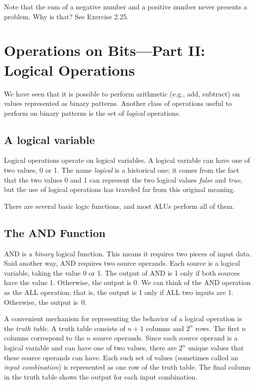 \documentclass{patt}
\begin{document}
\pagebreak

Note that the sum of a negative number and a positive number never
presents a problem.  Why is that? See Exercise 2.25.

\section{Operations on Bits---Part II: Logical Operations}

We have seen that it is possible to perform arithmetic (e.g., add,
subtract) on values represented as binary patterns.  Another class of
operations useful to perform on binary patterns is the set
of {\em logical} operations.

\subsection{A logical variable}

Logical operations operate on logical variables.  A logical variable
can have one of two values, 0 or 1.  The name {\em logical} is a
historical one; it comes from the fact that the two values 0 and 1 can
represent the two logical values {\em false} and {\em true}, but the
use of logical operations has traveled far from this original meaning.

There are several basic logic functions, and most ALUs perform all of them.

\subsection{The AND Function}

AND is a {\em binary} logical function.  This means it requires two
pieces of input data.
Said another way, AND requires two source operands.  Each source
is a logical variable, taking the value 0 or 1.  The output of
AND is 1 only if both sources
have the value 1.  Otherwise, the output is 0.  We can think
of the AND operation as the ALL operation; that is, the
output is 1 only if ALL two inputs are 1. Otherwise, the
output is~0.

A convenient mechanism for representing the behavior of a logical
operation is the {\em truth table}.  A truth table consists of
$n+1$ columns and $2^n$ rows.  The first
$n$ columns correspond to the $n$ source operands.  Since each
source operand is a logical variable and can have one of two
values, there are $2^n$ unique values that these source operands
can have.  Each such set of values (sometimes called an {\em input
combination}) is represented as one row of the truth table.  The
final column in the truth table
shows the output for each input combination.
\end{document}
